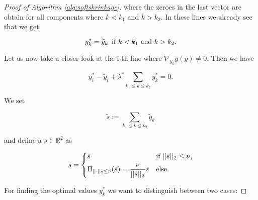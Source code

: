 \begin{proof}[Proof of Algorithm \ref{alg:softshrinkage}]
                where the zeroes in the last vector are obtain for all components where $k < k_{1}$ and $k > k_{2}$. In these lines we already see that we get

                    $$y^{\ast}_{k} = \tilde{y}_{k} \,\,\, \textnormal{if} \,\, k < k_{1} \,\, \textnormal{and} \,\, k > k_{2}.$$

                Let us now take a closer look at the i-th line where $\nabla_{y_{k}} g(y) \ne 0$. Then we have

                    \begin{equation}
                        y^{\ast}_{i} - \tilde{y}_{i} + \lambda^{\ast} \sum_{k_{1} \le k \le k_{2}} y^{\ast}_{k} = 0. \label{eq:ithRow}
                    \end{equation}

                We set %



                    $$\tilde{s} := \sum\limits_{k_{1} \le k \le k_{2}} \tilde{y}_{k}$$

                and define a $s \in \mathbb{R}^{2}$ as

                    \[
                        s =
                            \begin{dcases*}
                                \tilde{s} & \textnormal{if $||\tilde{s}||_{2} \le \nu$},\\
                                \Pi_{||\cdot||_{2} \le \nu}(\tilde{s}) = \frac{\nu}{||\tilde{s}||_{2}} \tilde{s} & \textnormal{else}.
                            \end{dcases*}
                    \]

                \newpage

                For finding the optimal values $y^{\ast}_{k}$ we want to distinguish between two cases:


\end{proof}
